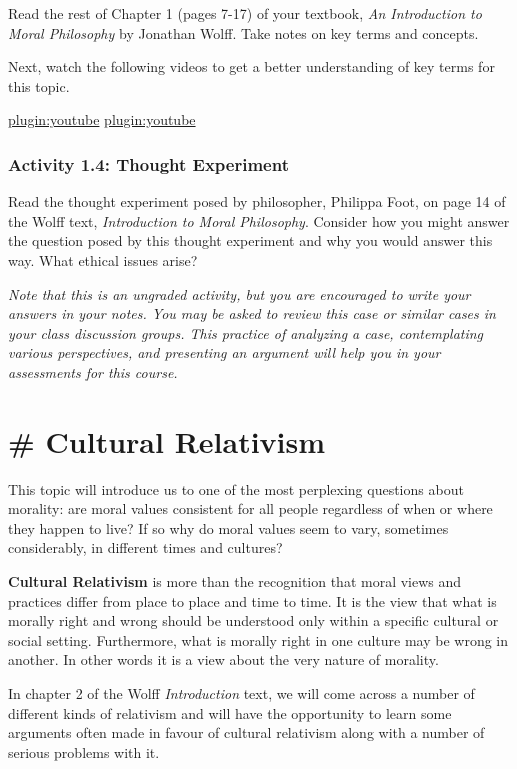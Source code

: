 \documentclass[
]{book}
\begin{document}
Read the rest of Chapter 1 (pages 7-17) of your textbook, \emph{An Introduction to
Moral Philosophy} by Jonathan Wolff. Take notes on key terms and concepts.

Next, watch the following videos to get a better understanding of key terms for
this topic.

\href{https://www.youtube.com/watch?v=h_sufC5nY18}{plugin:youtube}
\href{https://www.youtube.com/watch?v=NKEhdsnKKHs}{plugin:youtube}

\hypertarget{activity-1.4-thought-experiment-2}{%
\subsubsection{Activity 1.4: Thought Experiment}\label{activity-1.4-thought-experiment-2}}

Read the thought experiment posed by philosopher, Philippa Foot, on page 14 of the Wolff text, \emph{Introduction to Moral Philosophy}. Consider how you might answer the question posed by this thought experiment and why you would answer this way. What ethical issues arise?

\emph{Note that this is an ungraded activity, but you are encouraged to write your answers in your notes. You may be asked to review this case or similar cases in your class discussion groups. This practice of analyzing a case, contemplating various perspectives, and presenting an argument will help you in your assessments for this course.}

\hypertarget{cultural-relativism}{%
\section{\# Cultural Relativism}\label{cultural-relativism}}

This topic will introduce us to one of the most perplexing questions about
morality: are moral values consistent for all people regardless of when or where
they happen to live? If so why do moral values seem to vary, sometimes
considerably, in different times and cultures?

\textbf{Cultural Relativism} is more than the recognition that moral views and
practices differ from place to place and time to time. It is the view that what
is morally right and wrong should be understood only within a specific cultural
or social setting. Furthermore, what is morally right in one culture may be
wrong in another. In other words it is a view about the very nature of morality.

In chapter 2 of the Wolff \emph{Introduction} text, we will come across a number of
different kinds of relativism and will have the opportunity to learn some
arguments often made in favour of cultural relativism along with a number of
serious problems with it.
\end{document}
